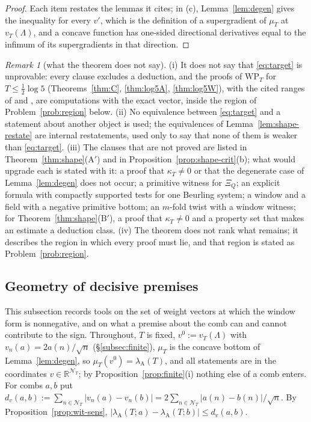 \documentclass[11pt]{amsart}
\theoremstyle{definition}
\theoremstyle{remark}
\newtheorem{remark}[theorem]{Remark}
\newcommand{\R}{\mathbb R}
\newcommand{\lamA}{\lambda_{\mathrm A}(T)}
\newcommand{\NT}{\mathcal N_T}
\begin{document}
\begin{proof}
Each item restates the lemmas it cites; in (c), Lemma~\ref{lem:degen} gives the inequality for every $v'$, which is the definition of a
supergradient of $\mu_T$ at $v_T(\Lambda)$, and a concave function has one-sided directional derivatives equal to the infimum of its
supergradients in that direction.
\end{proof}

\begin{remark}[what the theorem does not say]\label{rem:shape-scope}
(i) It does not say that \eqref{eq:target} is unprovable: every clause excludes a deduction, and the proofs of $\mathrm{WP}_T$ for
$T\le\frac12\log5$ (Theorems~\ref{thm:C}, \ref{thm:log5A}, \ref{thm:log5W}), with the cited ranges of \cite{Zhu2026} and \cite{Liu2026},
are computations with the exact vector, inside the region of Problem~\ref{prob:region} below. (ii) No equivalence between
\eqref{eq:target} and a statement about another object is used; the equivalences of Lemma~\ref{lem:shape-restate} are internal
restatements, used only to say that none of them is weaker than \eqref{eq:target}. (iii) The clauses that are not proved are listed in
Theorem~\ref{thm:shape}(A$'$) and in Proposition~\ref{prop:shape-crit}(b); what would upgrade each is stated with it: a proof that
$\kappa_T\ne0$ or that the degenerate case of Lemma~\ref{lem:degen} does not occur; a primitive witness for $\Xi_Q$; an explicit formula
with compactly supported tests for one Beurling system; a window and a field with a negative primitive bottom; an $m$-fold twist with
a window witness; for Theorem~\ref{thm:shape}(B$'$), a proof that $\kappa_T\ne0$ and a property set that makes an estimate a deduction class. (iv) The theorem does not rank what remains; it describes the region in which every proof must lie, and that region
is stated as Problem~\ref{prob:region}.
\end{remark}


\subsection{Geometry of decisive premises}\label{subsec:shape-geom}

This subsection records tools on the set of weight vectors at which the window form is nonnegative, and on what a
premise about the comb can and cannot contribute to the sign. Throughout, $T$ is fixed, $v^0:=v_T(\Lambda)$ with
$v_n(a)=2a(n)/\sqrt n$ (\S\ref{subsec:finite}), $\mu_T$ is the concave bottom of Lemma~\ref{lem:degen}, so $\mu_T(v^0)=\lamA$,
and all statements are in the coordinates $v\in\R^{\NT}$; by Proposition~\ref{prop:finite}(i) nothing else of a comb enters.
For combs $a,b$ put $d_v(a,b):=\sum_{n\in\NT}|v_n(a)-v_n(b)|=2\sum_{n\in\NT}|a(n)-b(n)|/\sqrt n$. By Proposition~\ref{prop:wit-sens},
$|\lambda_{\mathrm A}(T;a)-\lambda_{\mathrm A}(T;b)|\le d_v(a,b)$.
\end{document}
